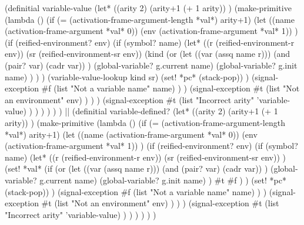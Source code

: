 \begin{code:lisp}
(definitial variable-value
  (let* ((arity 2)
         (arity+1 (+ 1 arity)) )
    (make-primitive
     (lambda ()
       (if (= (activation-frame-argument-length *val*) arity+1)
           (let ((name (activation-frame-argument *val* 0))
                 (env (activation-frame-argument *val* 1)) )
             (if (reified-environment? env)
                 (if (symbol? name)
                     (let* ((r (reified-environment-r env))
                            (sr (reified-environment-sr env))
                            (kind
                             (or (let ((var (assq name r)))
                                   (and (pair? var) (cadr var)) )
                                 (global-variable? g.current name)
                                 (global-variable? g.init name) ) ) )
                       (variable-value-lookup kind sr)
                       (set! *pc* (stack-pop)) )
                     (signal-exception
                      #f (list "Not a variable name" name) ) )
                 (signal-exception
                  #t (list "Not an environment" env) ) ) )
           (signal-exception
            #t (list "Incorrect arity" 'variable-value) ) ) ) ) ) )
||
(definitial variable-defined?
  (let* ((arity 2)
         (arity+1 (+ 1 arity)) )
    (make-primitive
     (lambda ()
       (if (= (activation-frame-argument-length *val*) arity+1)
           (let ((name (activation-frame-argument *val* 0))
                 (env (activation-frame-argument *val* 1)) )
             (if (reified-environment? env)
                 (if (symbol? name)
                     (let* ((r (reified-environment-r env))
                            (sr (reified-environment-sr env)) )
                       (set! *val*
                             (if (or (let ((var (assq name r)))
                                       (and (pair? var) (cadr var)) )
                                     (global-variable? g.current name)
                                     (global-variable? g.init name) )
                                 #t #f ) )
                       (set! *pc* (stack-pop)) )
                     (signal-exception
                      #f (list "Not a variable name" name) ) )
                 (signal-exception
                  #t (list "Not an environment" env) ) ) )
           (signal-exception
            #t (list "Incorrect arity" 'variable-value) ) ) ) ) ) )
\end{code:lisp}

